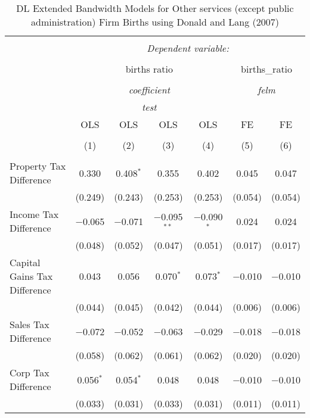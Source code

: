 
\begin{table}[!htbp] \centering 
  \caption{DL Extended Bandwidth Models for  Other services (except public administration) Firm Births using Donald and Lang (2007)} 
  \label{} 
\begin{tabular}{@{\extracolsep{5pt}}lcccccc} 
\\[-1.8ex]\hline 
\hline \\[-1.8ex] 
 & \multicolumn{6}{c}{\textit{Dependent variable:}} \\ 
\cline{2-7} 
\\[-1.8ex] & \multicolumn{4}{c}{births ratio} & \multicolumn{2}{c}{births\_ratio} \\ 
\\[-1.8ex] & \multicolumn{4}{c}{\textit{coefficient}} & \multicolumn{2}{c}{\textit{felm}} \\ 
 & \multicolumn{4}{c}{\textit{test}} & \multicolumn{2}{c}{\textit{}} \\ 
 & OLS & OLS & OLS & OLS & FE & FE \\ 
\\[-1.8ex] & (1) & (2) & (3) & (4) & (5) & (6)\\ 
\hline \\[-1.8ex] 
 Property Tax Difference & 0.330 & 0.408$^{*}$ & 0.355 & 0.402 & 0.045 & 0.047 \\ 
  & (0.249) & (0.243) & (0.253) & (0.253) & (0.054) & (0.054) \\ 
  Income Tax Difference & $-$0.065 & $-$0.071 & $-$0.095$^{**}$ & $-$0.090$^{*}$ & 0.024 & 0.024 \\ 
  & (0.048) & (0.052) & (0.047) & (0.051) & (0.017) & (0.017) \\ 
  Capital Gains Tax Difference & 0.043 & 0.056 & 0.070$^{*}$ & 0.073$^{*}$ & $-$0.010 & $-$0.010 \\ 
  & (0.044) & (0.045) & (0.042) & (0.044) & (0.006) & (0.006) \\ 
  Sales Tax Difference & $-$0.072 & $-$0.052 & $-$0.063 & $-$0.029 & $-$0.018 & $-$0.018 \\ 
  & (0.058) & (0.062) & (0.061) & (0.062) & (0.020) & (0.020) \\ 
  Corp Tax Difference & 0.056$^{*}$ & 0.054$^{*}$ & 0.048 & 0.048 & $-$0.010 & $-$0.010 \\ 
  & (0.033) & (0.031) & (0.033) & (0.031) & (0.011) & (0.011) \\ 

\end{tabular}
\end{table}
